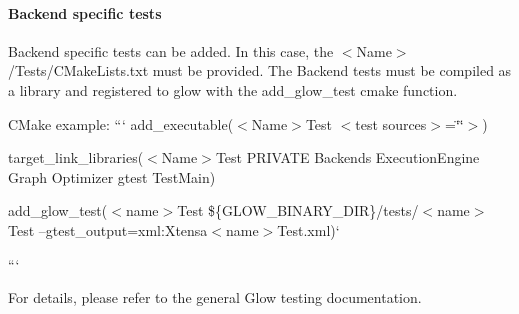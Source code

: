 \paragraph*{Backend specific tests}

Backend specific tests can be added. In this case, the {\ttfamily $<$Name$>$/\+Tests/\+C\+Make\+Lists.txt} must be provided. The Backend tests must be compiled as a library and registered to glow with the {\ttfamily add\+\_\+glow\+\_\+test} cmake function.

C\+Make example\+: ``` add\+\_\+executable($<$\+Name$>$Test $<$test sources$>$=\char`\"{}\char`\"{}$>$)

target\+\_\+link\+\_\+libraries($<$\+Name$>$Test P\+R\+I\+V\+A\+TE Backends Execution\+Engine Graph Optimizer gtest Test\+Main)

add\+\_\+glow\+\_\+test($<$name$>$Test \$\{G\+L\+O\+W\+\_\+\+B\+I\+N\+A\+R\+Y\+\_\+\+D\+IR\}/tests/$<$name$>$Test --gtest\+\_\+output=xml\+:Xtensa$<$name$>$Test.\+xml)`

```

For details, please refer to the general Glow testing documentation. 